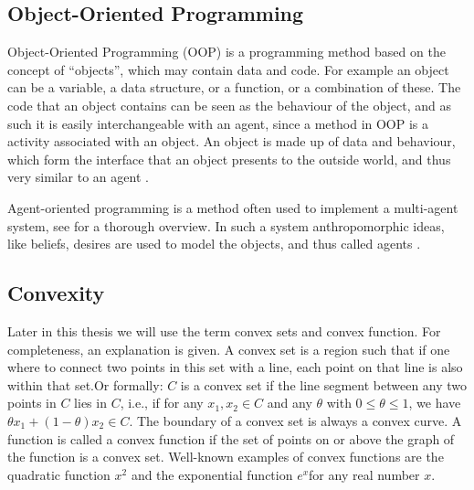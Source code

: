 \subsection{Object-Oriented Programming}

Object-Oriented Programming (OOP) is a programming method based on the concept of ``objects'', which may contain data and code. For example an object can be a variable, a data structure, or a function, or a combination of these. The code that an object contains can be seen as the behaviour of the object, and as such it is easily interchangeable with an agent, since a method in OOP is a activity associated with an object. An object is made up of data and behaviour, which form the interface that an object presents to the outside world, and thus very similar to an agent \citep{shoham1993agent}. 

Agent-oriented programming is a method often used to implement a multi-agent system, see \citep{mahar2012agent} for a thorough overview. In such a system anthropomorphic ideas, like beliefs, desires are used to model the objects, and thus called agents \citep{shoham1993agent}.%

% 


\subsection{Convexity}
\label{sec:convex}
Later in this thesis we will use the term convex sets and convex function. For completeness, an explanation is given. A convex set is a region such that if one where to connect two points in this set with a line, each point on that line is also within that set.Or formally: $C$ is a convex set if the line segment between any two points in $C$ lies in $C$, i.e., if for any $x_1, x_2 \in C$ and any $\theta$ with $0 \leq \theta \leq 1$, we have $\theta x_1 + (1 − \theta )x_2 \in C$. %
The boundary of a convex set is always a convex curve. A function is called a convex function if the set of points on or above the graph of the function is a convex set. Well-known examples of convex functions are the quadratic function $x^{2}$ and the exponential function $e^{x} $for any real number $x$.

